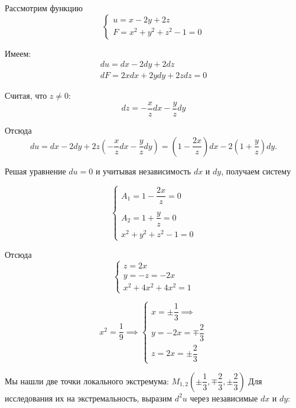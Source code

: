 \documentclass[../../main.tex]{subfiles}
\begin{document}
\begin{example}
	\;
	
	Рассмотрим функцию 
	\[ \begin{cases}
	u = x - 2y + 2z \\
	F = x^2 + y^2 + z^2 -1 = 0
	\end{cases} \]
	
	Имеем:
	\[\begin{array}{l}
	du = dx - 2dy + 2dz \\
	dF = 2xdx + 2ydy + 2zdz = 0
	\end{array}\]
	
	Считая, что $z \ne 0$:
	\[dz = -\dfrac{x}{z}dx - \dfrac{y}{z}dy\]
	
	Отсюда
	\[du = dx - 2dy + 2z\left( -\dfrac{x}{z}dx - 
	\dfrac{y}{z} dy \right) = 
	\left( 1 - \dfrac{2x}{z} \right)dx - 
	2\left( 1 + \dfrac{y}{z} \right)dy.\]
	
	Решая уравнение $du = 0$ и учитывая независимость $dx$ и $dy$,
	получаем систему
	
	\[
	\begin{cases}
	A_1 = 1 - \dfrac{2x}{z} = 0 \\
    \\
	A_2 = 1 + \dfrac{y}{z} = 0 \\
	x^2 + y^2 + z^2 - 1 = 0
	\end{cases} 
	\]
	
	Отсюда
	\[ \begin{cases}
	z = 2x \\
	y = -z = -2x \\
	x^2 + 4x^2 + 4x^2 = 1
	\end{cases} \]
	
	\[x^2 = \dfrac{1}{9} \implies
	 \begin{cases}
        x = \pm \dfrac{1}{3} \implies \\
        y = -2x = \mp \dfrac{2}{3} \\
        z = 2x = \pm \dfrac{2}{3}
	 \end{cases}
	\]
 
	Мы нашли две точки локального экстремума: $M_{1,2} 
	\left( \pm \dfrac{1}{3}, \mp \dfrac{2}{3}, 
	\pm \dfrac{2}{3} \right)$ Для исследования их на 
	экстремальность, выразим $d^2 u$ через
	независимые $dx$ и $dy$:
\end{example}
\end{document}
